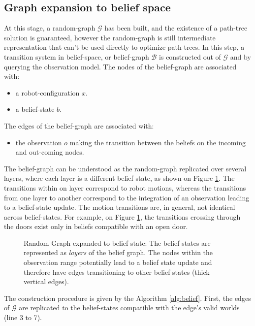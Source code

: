 \documentclass[letterpaper, 10 pt, conference]{ieeeconf}  %
\begin{document}
\subsection{Graph expansion to belief space}
\label{section:graph_expansion_belief_space}
At this stage, a random-graph $\mathcal{G}$ has been built, and the existence of a path-tree solution is guaranteed, however the random-graph is still intermediate representation that can't be used directly to optimize path-trees. In this step, a transition system in belief-space, or belief-graph $\mathcal{B}$ is constructed out of $\mathcal{G}$ and by querying the observation model. 
The nodes of the belief-graph are associated with:
\begin{itemize}
\item a robot-configuration $x$.
\item a belief-state $b$.
\end{itemize}
The edges of the belief-graph are associated with:
\begin{itemize}
\item the observation $o$ making the transition between the beliefs on the incoming and out-coming nodes.
\end{itemize}
The belief-graph can be understood as the random-graph replicated over several layers, where each layer is a different belief-state, as shown on Figure \ref{fig:belief_layers}. The transitions within on layer correspond to robot motions, whereas the transitions from one layer to another correspond to the integration of an observation leading to a belief-state update. The motion transitions are, in general, not identical across belief-states. For example, on Figure \ref{fig:belief_layers}, the transitions crossing through the doors exist only in beliefs compatible with an open door.
  
\begin{figure}[!htb]
 \caption{Random Graph expanded to belief state: The belief states are represented as \textit{layers} of the belief graph. The nodes within the observation range potentially lead to a belief state update and therefore have edges transitioning to other belief states (thick vertical edges).}
 \label{fig:belief_layers}
\end{figure}

The construction procedure is given by the Algorithm \ref{alg:belief}. First, the edges of $\mathcal{G}$ are replicated to the belief-states compatible with the edge's valid worlds (line 3 to 7).
\end{document}

